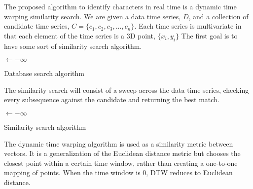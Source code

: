 The proposed algorithm to identify characters in real time is a dynamic time warping similarity search. 
We are given a data time series, \(D\), and a collection of candidate time series, \( C = \{c_1, c_2, c_3, ..., c_n\}\).
Each time series is multivariate in that each element of the time series is a 3D point, \(\{x_i, y_i\}\)
The first goal is to have some sort of similarity search algorithm.
\begin{algorithm}[H]



 \Input{\Collection, \D}
 \Best$\leftarrow -\infty$\;
 \Return{\Distance, \Location}
 \caption{Database search algorithm}
\end{algorithm}

The similarity search will consist of a sweep across the data time series, checking every subsequence against the candidate and returning the best match.
\begin{algorithm}[H]




 \Best$\leftarrow -\infty$\;
 \caption{Similarity search algorithm}
\end{algorithm}

The dynamic time warping algorithm is used as a similarity metric between vectors. It is a generalization of the Euclidean distance metric but chooses the closest point within a certain time window, rather than creating a one-to-one mapping of points. When the time window is 0, DTW reduces to Euclidean distance.

